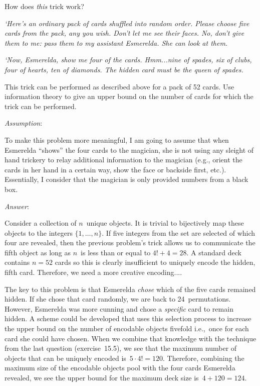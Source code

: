 \begin{problem}{15}{6}
  How does \textit{this} trick work?

  \begin{addmargin}[0.1in]{0.1in}
    \textnormal{\textit{`Here's an ordinary pack of cards shuffled into random order.  Please choose five cards from the pack, any you wish. Don't let me see their faces. No, don't give them to me: pass them to my assistant Esmerelda.  She can look at them.}}

    \textnormal{\textit{`Now, Esmerelda, show me four of the cards.  Hmm...nine of spades, six of clubs, four of hearts, ten of diamonds. The hidden card must be the queen of spades.}}
  \end{addmargin}

  This trick can be performed as described above for a pack of 52 cards.  Use information theory to give an upper bound on the number of cards for which the trick can be performed.
\end{problem}

\noindent
\textit{Assumption}:

To make this problem more meaningful, I am going to assume that when Esmerelda ``shows'' the four cards to the magician, she is not using any sleight of hand trickery to relay additional information to the magician (e.g., orient the cards in her hand in a certain way, show the face or backside first, etc.).  Essentially, I consider that the magician is only provided numbers from a black box.

\noindent
\textit{Answer}:

Consider a collection of $n$~unique objects.  It is trivial to bijectively map these objects to the integers $\{1,\ldots,n\}$. If five integers from the set are selected of which four are revealed, then the previous problem's trick allows us to communicate the fifth object as long as $n$~is less than or equal to ${4! + 4 = 28}$.  A standard deck contains ${n=52}$ cards so this is clearly insufficient to uniquely encode the hidden, fifth card.  Therefore, we need a more creative encoding....

The key to this problem is that Esmerelda \textit{chose} which of the five cards remained hidden.  If she chose that card randomly, we are back to 24~permutations.  However, Esmerelda was more cunning and chose a \textit{specific} card to remain hidden.  A scheme could be developed that uses this selection process to increase the upper bound on the number of encodable objects fivefold i.e.,~once for each card she could have chosen.  When we combine that knowledge with the technique from the last question (exercise~15.5), we see that the maximum number of objects that can be uniquely encoded is~${5\cdot4!=120}$.  Therefore, combining the maximum size of the encodable objects pool with the four cards Esmerelda revealed, we see the upper bound for the maximum deck size is~${4 + 120 = \boxed{124}}$.

